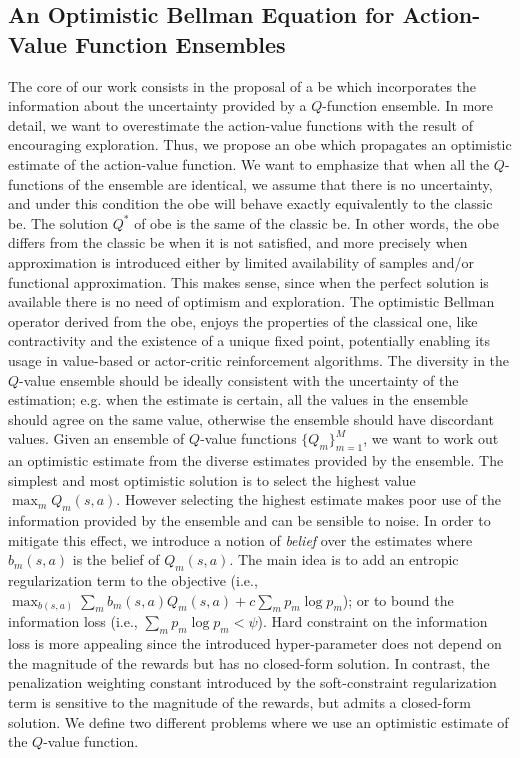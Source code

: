 \subsection{An Optimistic Bellman Equation for Action-Value Function Ensembles}
The core of our work consists in the proposal of a \gls{be} which incorporates the information about the uncertainty provided by a $Q$-function ensemble.
In more detail, we want to overestimate the action-value functions with the result of encouraging exploration.   
Thus, we propose an \gls{obe} which propagates an optimistic estimate of the action-value function. 
We want to emphasize that when all the $Q$-functions of the ensemble are identical, we assume that there is no uncertainty, and under this condition the \gls{obe} will behave exactly equivalently to the classic \gls{be}. The solution $Q^*$ of \gls{obe} is the same of the classic \gls{be}. In other words, the \gls{obe} differs from the classic \gls{be} when it is not satisfied, and more precisely when approximation is introduced either by limited availability of samples and/or functional approximation. This makes sense, since when the perfect solution is available there is no need of optimism and exploration. 
The optimistic Bellman operator derived from the \gls{obe}, enjoys the properties of the classical one, like contractivity and the existence of a unique fixed point, potentially enabling its usage in value-based or actor-critic reinforcement algorithms. 
The diversity in the $Q$-value ensemble should be ideally consistent with the uncertainty of the estimation; e.g. when the estimate is certain, all the values in the ensemble should agree on the same value, otherwise the ensemble should have discordant values.
Given an ensemble of $Q$-value functions $\{Q_m\}_{m=1}^M$, we want to work out an optimistic estimate from the diverse estimates provided by the ensemble. The simplest and most optimistic solution is to select the highest value $\max_m Q_m(s,a)$.
However selecting the highest estimate makes poor use of the information provided by the ensemble and can be sensible to noise. In order to mitigate this effect, we introduce a notion of \textit{belief} over the estimates where $b_m(s,a)$ is the belief of $Q_m(s,a)$. The main idea is to add an entropic regularization term to the objective (i.e., $\max_{b(s,a)} \sum_m b_m(s,a) Q_m(s,a) + c \sum_{m} p_m \log p_m $); or to bound the information loss (i.e., $\sum_m p_m \log p_m < \psi$). Hard constraint on the information loss is more appealing since the introduced hyper-parameter does not depend on the magnitude of the rewards but has no closed-form solution. In contrast, the penalization weighting constant introduced by the soft-constraint regularization term is sensitive to the magnitude of the rewards, but admits a closed-form solution.
We define two different problems where we use an optimistic estimate of the $Q$-value function.

